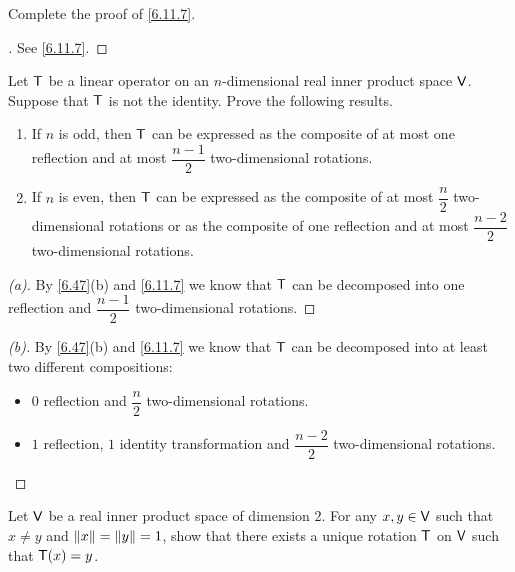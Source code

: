 \begin{ex}\label{ex:6.11.16}
  Complete the proof of \cref{6.11.7}.
\end{ex}

\begin{proof}[]
  See \cref{6.11.7}.
\end{proof}

\begin{ex}\label{ex:6.11.17}
  Let \(\mathsf{T}\) be a linear operator on an \(n\)-dimensional real inner product space \(\mathsf{V}\).
  Suppose that \(\mathsf{T}\) is not the identity.
  Prove the following results.
  \begin{enumerate}
    \item If \(n\) is odd, then \(\mathsf{T}\) can be expressed as the composite of at most one reflection and at most \(\dfrac{n - 1}{2}\) two-dimensional rotations.
    \item If \(n\) is even, then \(\mathsf{T}\) can be expressed as the composite of at most \(\dfrac{n}{2}\) two-dimensional rotations or as the composite of one reflection and at most \(\dfrac{n - 2}{2}\) two-dimensional rotations.
  \end{enumerate}
\end{ex}

\begin{proof}[(a)]
  By \cref{6.47}(b) and \cref{6.11.7} we know that \(\mathsf{T}\) can be decomposed into one reflection and \(\dfrac{n - 1}{2}\) two-dimensional rotations.
\end{proof}

\begin{proof}[(b)]
  By \cref{6.47}(b) and \cref{6.11.7} we know that \(\mathsf{T}\) can be decomposed into at least two different compositions:
  \begin{itemize}
    \item \(0\) reflection and \(\dfrac{n}{2}\) two-dimensional rotations.
    \item \(1\) reflection, \(1\) identity transformation and \(\dfrac{n - 2}{2}\) two-dimensional rotations.
  \end{itemize}
\end{proof}

\begin{ex}\label{ex:6.11.18}
  Let \(\mathsf{V}\) be a real inner product space of dimension \(2\).
  For any \(x, y \in \mathsf{V}\) such that \(x \neq y\) and \(\left\lVert x\right\rVert = \left\lVert y\right\rVert = 1\), show that there exists a unique rotation \(\mathsf{T}\) on \(\mathsf{V}\) such that \(\mathsf{T}(x) = y\).
\end{ex}

